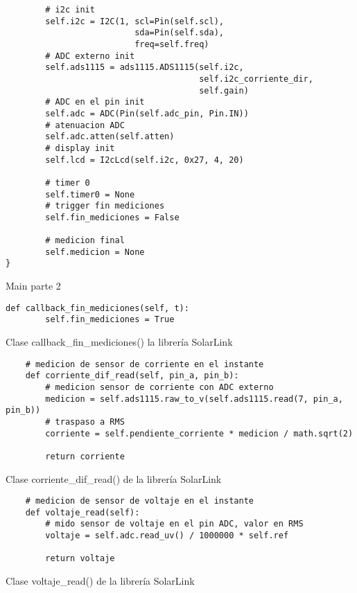 \begin{listing}[H]
\begin{verbatim}
        # i2c init
        self.i2c = I2C(1, scl=Pin(self.scl), 
                          sda=Pin(self.sda), 
                          freq=self.freq)
        # ADC externo init
        self.ads1115 = ads1115.ADS1115(self.i2c,
                                       self.i2c_corriente_dir,
                                       self.gain)
        # ADC en el pin init
        self.adc = ADC(Pin(self.adc_pin, Pin.IN))
        # atenuacion ADC
        self.adc.atten(self.atten)
        # display init
        self.lcd = I2cLcd(self.i2c, 0x27, 4, 20)

        # timer 0
        self.timer0 = None
        # trigger fin mediciones
        self.fin_mediciones = False

        # medicion final
        self.medicion = None
}
\end{verbatim}
\caption{Main parte 2}
\label{main-2}
\end{listing}

\begin{listing}[H]
\begin{verbatim}
def callback_fin_mediciones(self, t):
        self.fin_mediciones = True
\end{verbatim}
\caption{Clase callback\_fin\_mediciones() la librería SolarLink}
\label{callback-mediciones}
\end{listing}

\begin{listing}[H]
\begin{verbatim}
    # medicion de sensor de corriente en el instante
    def corriente_dif_read(self, pin_a, pin_b):
        # medicion sensor de corriente con ADC externo
        medicion = self.ads1115.raw_to_v(self.ads1115.read(7, pin_a, pin_b))
        # traspaso a RMS
        corriente = self.pendiente_corriente * medicion / math.sqrt(2)

        return corriente
\end{verbatim}
\caption{Clase corriente\_dif\_read() de la librería SolarLink}
\label{clase corriente}
\end{listing}

\begin{listing}[H]
\begin{verbatim}
    # medicion de sensor de voltaje en el instante
    def voltaje_read(self):
        # mido sensor de voltaje en el pin ADC, valor en RMS
        voltaje = self.adc.read_uv() / 1000000 * self.ref

        return voltaje
\end{verbatim}
\caption{Clase voltaje\_read() de la librería SolarLink}
\label{clase voltaje}
\end{listing}

